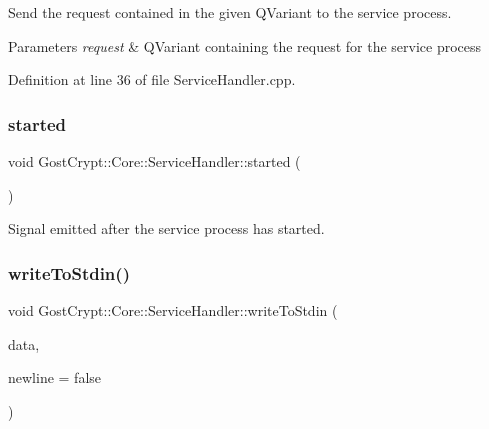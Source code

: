 Send the request contained in the given Q\+Variant to the service process. 


\begin{DoxyParams}{Parameters}
{\em request} & Q\+Variant containing the request for the service process \\
\hline
\end{DoxyParams}


Definition at line 36 of file Service\+Handler.\+cpp.

\mbox{\label{class_gost_crypt_1_1_core_1_1_service_handler_a1ac2289485ca80ad359d199c2529ec31}} 
\subsubsection{\texorpdfstring{started}{started}}
{\footnotesize\ttfamily void Gost\+Crypt\+::\+Core\+::\+Service\+Handler\+::started (\begin{DoxyParamCaption}{ }\end{DoxyParamCaption})\hspace{0.3cm}{\ttfamily [signal]}}



Signal emitted after the service process has started. 

\mbox{\label{class_gost_crypt_1_1_core_1_1_service_handler_ae2fc74c0f1c61adedf4aa122fe2a4336}} 
\subsubsection{\texorpdfstring{write\+To\+Stdin()}{writeToStdin()}}
{\footnotesize\ttfamily void Gost\+Crypt\+::\+Core\+::\+Service\+Handler\+::write\+To\+Stdin (\begin{DoxyParamCaption}\item[{Q\+Shared\+Pointer$<$ Q\+Byte\+Array $>$}]{data,  }\item[{bool}]{newline = {\ttfamily false} }\end{DoxyParamCaption})\hspace{0.3cm}{\ttfamily [protected]}}



